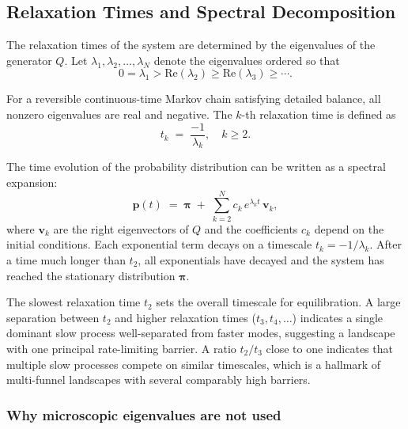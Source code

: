 \subsection{Relaxation Times and Spectral Decomposition}\label{subsec:relaxation}

The relaxation times of the system are determined by the eigenvalues of the generator
$Q$. Let $\lambda_1, \lambda_2, \ldots, \lambda_N$ denote the eigenvalues ordered so
that
\begin{equation}\label{eq:eigenvalue-ordering}
  0 = \lambda_1 > \mathrm{Re}(\lambda_2) \geq \mathrm{Re}(\lambda_3) \geq \cdots.
\end{equation}

For a reversible continuous-time Markov chain satisfying detailed balance, all nonzero
eigenvalues are real and negative. The $k$-th relaxation time is defined as
\begin{equation}\label{eq:relaxation-time}
  t_k \;=\; \frac{-1}{\lambda_k}, \quad k \geq 2.
\end{equation}

The time evolution of the probability distribution can be written as a spectral
expansion:
\begin{equation}\label{eq:spectral-decomposition}
  \mathbf{p}(t)
  \;=\;
  \boldsymbol{\pi}
  \;+\;
  \sum_{k=2}^{N} c_k\, e^{\lambda_k t}\, \mathbf{v}_k,
\end{equation}
where $\mathbf{v}_k$ are the right eigenvectors of $Q$ and the coefficients $c_k$
depend on the initial conditions. Each exponential term decays on a timescale
$t_k = -1/\lambda_k$. After a time much longer than $t_2$, all exponentials have
decayed and the system has reached the stationary distribution $\boldsymbol{\pi}$.

The slowest relaxation time $t_2$ sets the overall timescale for equilibration.
A large separation between $t_2$ and higher relaxation times ($t_3, t_4, \ldots$)
indicates a single dominant slow process well-separated from faster modes, suggesting a
landscape with one principal rate-limiting barrier. A ratio $t_2/t_3$ close to one
indicates that multiple slow processes compete on similar timescales, which is a
hallmark of multi-funnel landscapes with several comparably high barriers.

\subsubsection{Why microscopic eigenvalues are not used}

